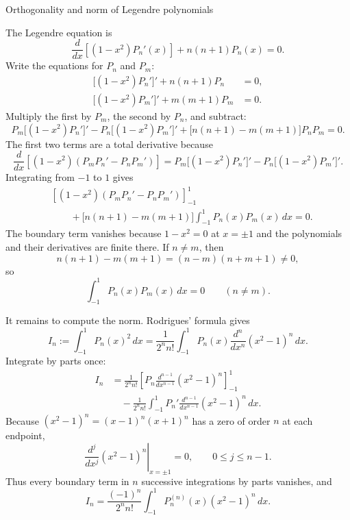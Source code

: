 \documentclass[11pt]{beamer}
\begin{document}
\begin{frame}[allowframebreaks]{Orthogonality and norm of Legendre polynomials}
\footnotesize

The Legendre equation is
\begin{equation}
  \frac{d}{dx}\!\left[(1-x^2)P_n'(x)\right]
  +n(n+1)P_n(x)=0.
  \label{eq:legendre-sl}
\end{equation}
Write the equations for $P_n$ and $P_m$:
\begin{align*}
  \bigl[(1-x^2)P_n'\bigr]'+n(n+1)P_n&=0,\\
  \bigl[(1-x^2)P_m'\bigr]'+m(m+1)P_m&=0.
\end{align*}
Multiply the first by $P_m$, the second by $P_n$, and subtract:
\[
  P_m\bigl[(1-x^2)P_n'\bigr]'
  -P_n\bigl[(1-x^2)P_m'\bigr]'
  +\bigl[n(n+1)-m(m+1)\bigr]P_nP_m=0.
\]
The first two terms are a total derivative because
\[
  \frac{d}{dx}\!\left[(1-x^2)(P_mP_n'-P_nP_m')\right]
  =P_m\bigl[(1-x^2)P_n'\bigr]'
   -P_n\bigl[(1-x^2)P_m'\bigr]'.
\]
Integrating from $-1$ to $1$ gives
\begin{align*}
  &\left[(1-x^2)(P_mP_n'-P_nP_m')\right]_{-1}^{1}\\
  &\qquad+\bigl[n(n+1)-m(m+1)\bigr]
    \int_{-1}^{1}P_n(x)P_m(x)\,dx=0.
\end{align*}
The boundary term vanishes because $1-x^2=0$ at $x=\pm1$ and the polynomials and their
derivatives are finite there. If $n\ne m$, then
\[
  n(n+1)-m(m+1)=(n-m)(n+m+1)\ne0,
\]
so
\begin{equation}
  \int_{-1}^{1}P_n(x)P_m(x)\,dx=0
  \qquad(n\ne m).
  \label{eq:legendre-orthogonal-zero}
\end{equation}

It remains to compute the norm. Rodrigues' formula gives
\[
  I_n:=\int_{-1}^{1}P_n(x)^2\,dx
  =\frac{1}{2^n n!}\int_{-1}^{1}
    P_n(x)\frac{d^n}{dx^n}(x^2-1)^n\,dx.
\]
Integrate by parts once:
\begin{align*}
  I_n
  &=\frac{1}{2^n n!}
    \left[P_n\frac{d^{n-1}}{dx^{n-1}}(x^2-1)^n\right]_{-1}^{1}\\
  &\quad-\frac{1}{2^n n!}\int_{-1}^{1}
    P_n'\frac{d^{n-1}}{dx^{n-1}}(x^2-1)^n\,dx.
\end{align*}
Because $(x^2-1)^n=(x-1)^n(x+1)^n$ has a zero of order $n$ at each endpoint,
\[
  \left.\frac{d^j}{dx^j}(x^2-1)^n\right|_{x=\pm1}=0,
  \qquad 0\le j\le n-1.
\]
Thus every boundary term in $n$ successive integrations by parts vanishes, and
\begin{equation}
  I_n=\frac{(-1)^n}{2^n n!}\int_{-1}^{1}
  P_n^{(n)}(x)(x^2-1)^n\,dx.
  \label{eq:legendre-norm-ibp}
\end{equation}


\end{frame}
\end{document}
